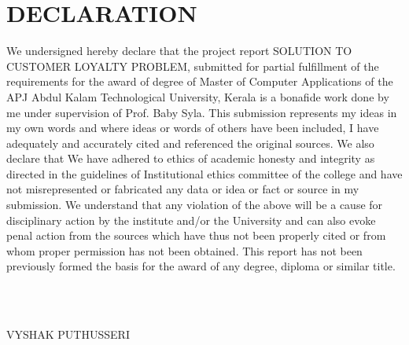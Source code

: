 \chapter*{\rm \large \bf DECLARATION}
\vspace{4.0mm}
\setlength{\parindent}{6em}
We undersigned hereby declare that the project report
SOLUTION TO CUSTOMER LOYALTY PROBLEM, submitted for partial
fulfillment of the requirements for the award of degree of Master of Computer Applications
of the APJ Abdul Kalam Technological University, Kerala is a bonafide work done
by me under supervision of Prof. Baby Syla. This submission represents my
ideas in my own words and where ideas or words of others have been included, I
have adequately and accurately cited and referenced the original sources. We also
declare that We have adhered to ethics of academic honesty and integrity as directed in the guidelines of Institutional ethics committee of the college and have not misrepresented or fabricated any data or idea or fact or source in my
submission. We understand that any violation of the above will be a cause for
disciplinary action by the institute and/or the University and can also evoke
penal action from the sources which have thus not been properly cited or from
whom proper permission has not been obtained. This report has not been
previously formed the basis for the award of any degree, diploma or similar
title.

\vspace{0.3 cm}

\\
\\
\begin{flushleft}
\hfill {VYSHAK PUTHUSSERI}\\

\end{flushleft}
\newpage 

